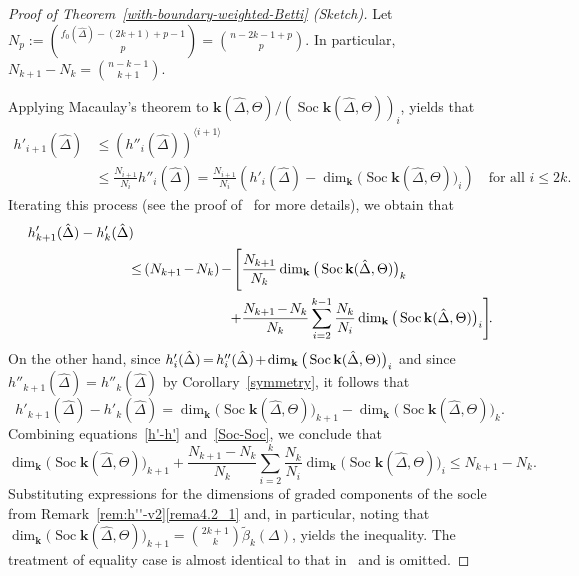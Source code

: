 \documentclass[ALCO,ThmDefs,Unicode,epreuves]{cedram}
\DeclareMathOperator{\Soc}{Soc}
\newcommand{\complet}[1]{\hat{#1}}
\newcommand{\field}{\mathbf{k}}
\newcommand*{\Mk}{\mkern -2mu}
\begin{document}
\begin{proof}[Proof of Theorem~\ref{with-boundary-weighted-Betti} (Sketch)]
Let $N_p:=\binom{f_0(\complet{\Delta})-(2k+1)+p-1}{p}=\binom{n-2k-1+p}{p}$. In particular, $N_{k+1}-N_k=\binom{n-k-1}{k+1}$.

Applying Macaulay's theorem to $\field(\complet{\Delta},\Theta)/(\Soc \field(\complet{\Delta},\Theta))_i$, yields that 
\begin{align*}
h'_{i+1}(\complet{\Delta})&\leq (h''_i(\complet{\Delta}))^{\langle i+1 \rangle} 
\\
&\leq \frac{N_{i+1}}{N_i}h''_i(\complet{\Delta}) =
\frac{N_{i+1}}{N_i} \left(h'_i(\complet{\Delta})-\dim_\field \big(\Soc \field(\complet{\Delta},\Theta)\big)_i\right)
\quad \mbox{for all }i\leq 2k.
\end{align*}
Iterating this process (see the proof of~\cite[Theorem~4.4]{Novik-Swartz-09:Socles} for more details), we obtain that
\begin{equation}\label{h'-h'}
\begin{aligned} 
&h'_{k+1}(\complet{\Delta})-h'_{k}(\complet{\Delta})\\
&\hspace*{25mm}\leq\Mk (N_{k+1}\Mk -\Mk N_k)\Mk -\Mk 
\left[\frac{N_{k+1}}{N_k} \dim_\field \big(\Soc \field(\complet{\Delta},\Theta)\big)_k \vphantom{\displaystyle\sum_{i=2}^{k-1}}\right.\\
&\hspace*{50mm}\left. + 
\frac{N_{k+1}\Mk -\Mk N_k}{N_k}\sum_{i=2}^{k-1} \frac{N_k}{N_i}\dim_\field \big(\Soc \field(\complet{\Delta},\Theta)\big)_i
\right]\Mk \Mk \Mk .
\end{aligned}
\end{equation}
On the other hand, since 
$h'_i(\complet{\Delta})\Mk =\Mk h''_i(\complet{\Delta})\Mk +\Mk \dim_\field \big(\Soc \field(\complet{\Delta},\Theta)\big)_i$ and since $h''_{k+1}(\complet{\Delta})=h''_{k}(\complet{\Delta})$ by Corollary~\ref{symmetry}, it follows that
\begin{equation} \label{Soc-Soc}
h'_{k+1}(\complet{\Delta})-h'_{k}(\complet{\Delta})=\dim_\field \big(\Soc \field(\complet{\Delta},\Theta)\big)_{k+1}-\dim_\field \big(\Soc \field(\complet{\Delta},\Theta)\big)_k.
\end{equation}
Combining equations~\eqref{h'-h'} and~\eqref{Soc-Soc}, we conclude that
\[
\dim_\field \big(\Soc \field(\complet{\Delta},\Theta)\big)_{k+1}+\frac{N_{k+1}-N_k}{N_k}\sum_{i=2}^{k} \frac{N_k}{N_i}\dim_\field \big(\Soc \field(\complet{\Delta},\Theta)\big)_i \leq N_{k+1}-N_k.
\]
Substituting expressions for the dimensions of graded components of the socle from Remark~\ref{rem:h''-v2}\eqref{rema4.2_1} and, in particular, noting that 
$\dim_\field \big(\Soc \field(\complet{\Delta},\Theta)\big)_{k+1}=\binom{2k+1}{k}\tilde{\beta}_k(\Delta)$, yields the inequality. The treatment of equality case is almost identical to that in~\cite[Theorem~4.4]{Novik-Swartz-09:Socles} and is omitted.
\end{proof}
\end{document}
